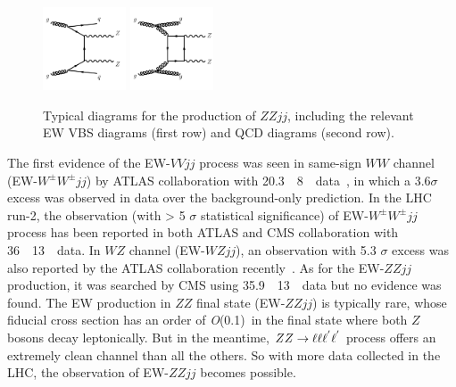 \begin{figure}[!htbp]
\begin{center}
\includegraphics[width=0.22\textwidth]{figures/VBSZZ/diagram-QCDZZjj-gg.pdf}
\includegraphics[width=0.22\textwidth]{figures/VBSZZ/diagram-QCDZZjj-box.pdf}\\
\end{center}
\caption{Typical diagrams for the production of $ZZjj$, including the relevant EW VBS diagrams (first row) and QCD diagrams (second row).}
\label{fig:vbszz_diagrams}
\end{figure}

The first evidence of the EW-$VVjj$ process was seen in same-sign $WW$ channel (EW-$W^{\pm}W^{\pm}jj$) by ATLAS collaboration with 20.3~\ifb~8~\tev~data~\cite{PhysRevLett.113.141803},
in which a 3.6$\sigma$ excess was observed in data over the background-only prediction.
In the LHC run-2, the observation (with > 5 $\sigma$ statistical significance) of EW-$W^{\pm}W^{\pm}jj$ process has been reported in both ATLAS and CMS collaboration with 36~\ifb~13~\tev~data\cite{PhysRevLett.123.161801, Sirunyan:2017ret}.
In $WZ$ channel (EW-$WZjj$), an observation with 5.3 $\sigma$ excess was also reported by the ATLAS collaboration recently~\cite{2019469}.
As for the EW-$ZZjj$ production, it was searched by CMS using 35.9~\ifb~13~\tev~data but no evidence was found\cite{2017682}.
The EW production in $ZZ$ final state (EW-$ZZjj$) is typically rare, whose fiducial cross section has an order of \textit{O}(0.1)~\ifb in the final state where both $Z$ bosons decay leptonically.
But in the meantime, $ZZ \rightarrow \ell\ell\ell^{'}\ell^{'}$ process offers an extremely clean channel than all the others. So with more data collected in the LHC, the observation of EW-$ZZjj$ becomes possible.

